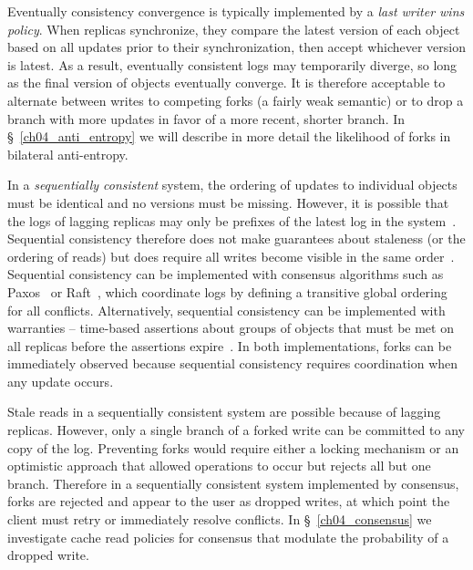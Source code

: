Eventually consistency convergence is typically implemented by a \emph{last writer wins policy}.
When replicas synchronize, they compare the latest version of each object based on all updates prior to their synchronization, then accept whichever version is latest.
As a result, eventually consistent logs may temporarily diverge, so long as the final version of objects eventually converge.
It is therefore acceptable to alternate between writes to competing forks (a fairly weak semantic) or to drop a branch with more updates in favor of a more recent, shorter branch.
In \S~\ref{ch04_anti_entropy} we will describe in more detail the likelihood of forks in bilateral anti-entropy.

In a \emph{sequentially consistent} system, the ordering of updates to individual objects must be identical and no versions must be missing.
However, it is possible that the logs of lagging replicas may only be prefixes of the latest log in the system~\cite{raynal_sequential_2002}.
Sequential consistency therefore does not make guarantees about staleness (or the ordering of reads) but does require all writes become visible in the same order~\cite{bermbach_consistency_2013}.
Sequential consistency can be implemented with consensus algorithms such as Paxos~\cite{paxos} or Raft~\cite{raft}, which coordinate logs by defining a transitive global ordering for all conflicts.
Alternatively, sequential consistency can be implemented with warranties -- time-based assertions about groups of objects that must be met on all replicas before the assertions expire~\cite{liu_warranties_2014}.
In both implementations, forks can be immediately observed because sequential consistency requires coordination when any update occurs.

Stale reads in a sequentially consistent system are possible because of lagging replicas.
However, only a single branch of a forked write can be committed to any copy of the log.
Preventing forks would require either a locking mechanism or an optimistic approach that allowed operations to occur but rejects all but one branch.
Therefore in a sequentially consistent system implemented by consensus, forks are rejected and appear to the user as dropped writes, at which point the client must retry or immediately resolve conflicts.
In \S~\ref{ch04_consensus} we investigate cache read policies for consensus that modulate the probability of a dropped write.

